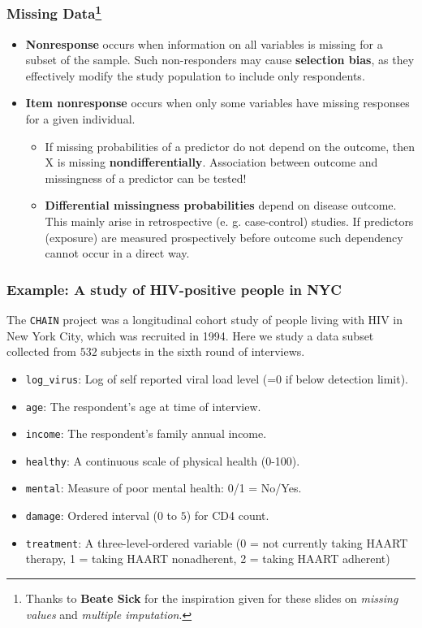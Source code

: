 \documentclass{beamer}\usepackage[]{graphicx}\usepackage[]{color}
\begin{document}
\usebackgroundtemplate{}
\begin{frame}
\frametitle{Missing Data\footnote{Thanks to \textbf{Beate Sick} for the
inspiration given for these slides on \textit{missing values} and
\textit{multiple imputation}.}}
\small
\begin{itemize}
\item \textbf{Nonresponse} occurs when information on all variables is missing
for a subset of the sample. Such non-responders may cause \textbf{selection bias},
as they effectively modify the study population to include only respondents.
\item \textbf{Item nonresponse} occurs when only some variables have missing
responses for a given individual.
\begin{itemize}
\item If missing probabilities of a predictor do not depend on the outcome,
then X is missing \textbf{nondifferentially}. Association between outcome
and missingness of a predictor can be tested!
\item \textbf{Differential missingness probabilities} depend on disease outcome.
This mainly arise in retrospective (e. g. case-control) studies.
If predictors (exposure) are measured prospectively before outcome
such dependency cannot occur in a direct way.
\end{itemize}
\end{itemize}
\end{frame}

\begin{frame}
\frametitle{Example: A study of HIV-positive people in NYC}
The \texttt{CHAIN} project was a longitudinal cohort study of people living with
HIV in New York City, which was recruited in 1994. Here we study a data subset
collected from $532$ subjects in the sixth round of interviews.
\begin{itemize}
\item \texttt{log\_virus}: Log of self reported viral load level (=0 if below detection limit).
\item \texttt{age}: The respondent's age at time of interview.
\item \texttt{income}: The respondent's family annual income.
\item \texttt{healthy}: A continuous scale of physical health (0-100).
\item \texttt{mental}: Measure of poor mental health: 0/1 = No/Yes.
\item \texttt{damage}: Ordered interval ($0$ to $5$) for CD4 count.
\item \texttt{treatment}: A three-level-ordered variable (0 = not currently
taking HAART therapy, 1 = taking HAART nonadherent, 2 = taking HAART adherent)
\end{itemize}
\end{frame}
\end{document}
